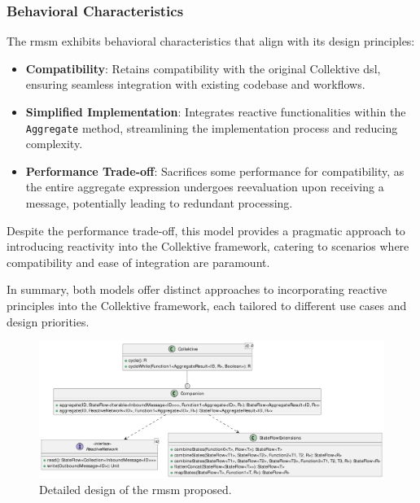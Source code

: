\subsubsection{Behavioral Characteristics}

The \ac{rmsm} exhibits behavioral characteristics that align with its design principles:

\begin{itemize}
    \item \textbf{Compatibility}: Retains compatibility with the original Collektive \ac{dsl}, ensuring seamless integration with existing codebase and workflows.
    \item \textbf{Simplified Implementation}: Integrates reactive functionalities within the \texttt{Aggregate} method, streamlining the implementation process and reducing complexity.
    \item \textbf{Performance Trade-off}: Sacrifices some performance for compatibility, as the entire aggregate expression undergoes reevaluation upon receiving a message, potentially leading to redundant processing.
\end{itemize}

Despite the performance trade-off, this model provides a pragmatic approach to introducing reactivity into the Collektive framework, catering to scenarios where compatibility and ease of integration are paramount.

In summary, both models offer distinct approaches to incorporating reactive principles into the Collektive framework, each tailored to different use cases and design priorities.

\begin{figure}
    \centering
    \includegraphics[width=\linewidth]{figures/collektive-rmsm-design.pdf}
    \caption{Detailed design of the \ac{rmsm} proposed.}
    \label{fig:collektive-rmsm-design}
\end{figure}
